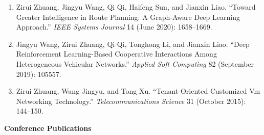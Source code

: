 \documentclass[letterpaper,11pt]{article}
\newcommand{\contentlength}{5.25in} %
\begin{document}
\begin{tcolorbox}[flush right,breakable,colback=white,colframe=white,width=\contentlength]
\begin{enumerate}[itemsep=0mm]
			\item  Zirui Zhuang, Jingyu Wang, Qi Qi, Haifeng Sun, and Jianxin Liao. “Toward Greater Intelligence in Route Planning: A Graph-Aware Deep Learning Approach.” \textit{IEEE Systems Journal} 14 (June 2020): 1658–1669.
			\item Jingyu Wang, Zirui Zhuang, Qi Qi, Tonghong Li, and Jianxin Liao. “Deep Reinforcement Learning-Based Cooperative Interactions Among Heterogeneous Vehicular Networks.” \textit{Applied Soft Computing} 82 (September 2019): 105557.
			\item Zirui Zhuang, Wang Jingyu, and Tong Xu. “Tenant-Oriented Customized Vm Networking Technology.” \textit{Telecommunications Science} 31 (October 2015): 144–150.
		\end{enumerate}
		
		\textbf{Conference Publications}
		

\end{tcolorbox}
\end{document}
